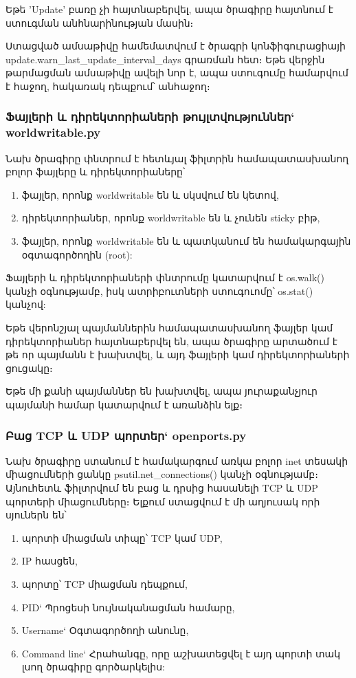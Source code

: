 \documentclass[a4paper,12pt]{article}
\begin{document}
\begin{sloppypar}
\begin{itemize}
	Եթե 'Update' բառը չի հայտնաբերվել, ապա ծրագիրը հայտնում է ստուգման անհնարինության մասին։
\end{itemize}

Ստացված ամսաթիվը համեմատվում է ծրագրի կոնֆիգուրացիայի
update.warn\_last\_update\_interval\_days
գրառման հետ։ Եթե վերջին թարմացման ամսաթիվը ավելի նոր է,
ապա ստուգումը համարվում է հաջող, հակառակ դեպքում՝ անհաջող։


\subsubsection{Ֆայլերի և դիրեկտորիաների թույլտվություններ` worldwritable.py}


Նախ ծրագիրը փնտրում է հետևյալ ֆիլտրին համապատասխանող բոլոր ֆայլերը և դիրեկտորիաները՝

\begin{enumerate}
\item ֆայլեր, որոնք worldwritable են և սկսվում են կետով,
\item դիրեկտորիաներ, որոնք worldwritable են և չունեն sticky բիթ,
\item ֆայլեր, որոնք worldwritable են և պատկանում են համակարգային օգտագործողին (root):
\end{enumerate}

Ֆայլերի և դիրեկտորիաների փնտրումը կատարվում է os.walk() կանչի օգնությամբ,
իսկ ատրիբուտների ստուգուոմը՝ os.stat() կանչով:

Եթե վերոնշյալ պայմաններին համապատասխանող ֆայլեր կամ դիրեկտորիաներ հայտնաբերվել են,
ապա ծրագիրը արտածում է թե որ պայմանն է խախտվել, և այդ ֆայլերի կամ դիրեկտորիաների
ցուցակը։

Եթե մի քանի պայմաններ են խախտվել, ապա յուրաքանչյուր պայմանի համար կատարվում է
առանձին ելք։


\subsubsection{Բաց TCP և UDP պորտեր` openports.py}


Նախ ծրագիրը ստանում է համակարգում առկա բոլոր inet տեսակի միացումների ցանկը
psutil.net\_connections() կանչի օգնությամբ։
Այնուհետև ֆիլտրվում են բաց և դրսից հասանելի TCP և UDP պորտերի միացումները։
Ելքում ստացվում է մի աղյուսակ որի սյուներն են՝

\begin{enumerate}
\item պորտի միացման տիպը՝ TCP կամ UDP,
\item IP հասցեն,
\item պորտը՝ TCP միացման դեպքում,
\item PID` Պրոցեսի նույնականացման համարը,
\item Username` Օգտագործողի անունը,
\item Command line` Հրահանգը, որը աշխատեցվել է այդ պորտի տակ լսող ծրագիրը գործարկելիս:
\end{enumerate}



\end{sloppypar}
\end{document}
